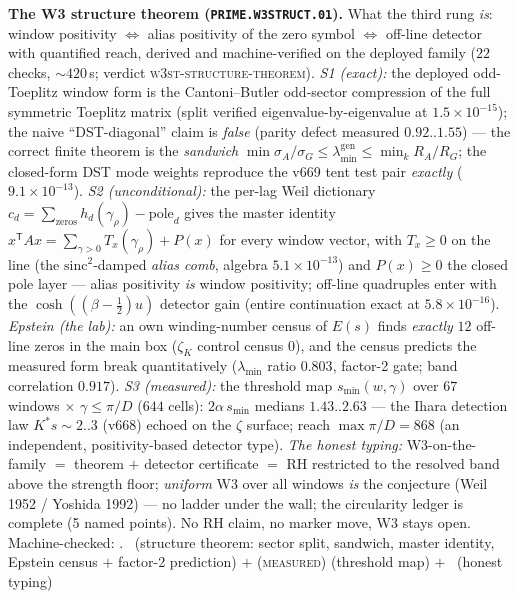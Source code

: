 \documentclass[11pt,a4paper]{article}
\theoremstyle{definition}
\begin{document}
\par\smallskip\noindent\textbf{The W3 structure theorem
(\texttt{PRIME.W3STRUCT.01}).}
What the third rung \emph{is}: window positivity $\Leftrightarrow$
alias positivity of the zero symbol $\Leftrightarrow$ off-line
detector with quantified reach, derived and machine-verified on the
deployed family ($22$ checks, ${\sim}420$\,s; verdict
\textsc{w3st-structure-theorem}).  \emph{S1 (exact):} the deployed
odd-Toeplitz window form is the Cantoni--Butler odd-sector
compression of the full symmetric Toeplitz matrix (split verified
eigenvalue-by-eigenvalue at $1.5\times10^{-15}$); the naive
``DST-diagonal'' claim is \emph{false} (parity defect measured
$0.92..1.55$) --- the correct finite theorem is the \emph{sandwich}
$\min\sigma_A/\sigma_G\le\lambda_{\min}^{\mathrm{gen}}\le
\min_k R_A/R_G$; the closed-form DST mode weights reproduce the
v669 tent test pair \emph{exactly} ($9.1\times10^{-13}$).
\emph{S2 (unconditional):} the per-lag Weil dictionary
$c_d=\sum_{\text{zeros}}h_d(\gamma_\rho)-\mathrm{pole}_d$ gives the
master identity $x^{\mathsf T}Ax=\sum_{\gamma>0}T_x(\gamma_\rho)
+P(x)$ for every window vector, with $T_x\ge0$ on the line (the
$\mathrm{sinc}^2$-damped \emph{alias comb}, algebra
$5.1\times10^{-13}$) and $P(x)\ge0$ the closed pole layer --- alias
positivity \emph{is} window positivity; off-line quadruples enter
with the $\cosh((\beta-\tfrac12)u)$ detector gain (entire
continuation exact at $5.8\times10^{-16}$).  \emph{Epstein (the
lab):} an own winding-number census of $E(s)$ finds \emph{exactly}
$12$ off-line zeros in the main box ($\zeta_K$ control census $0$),
and the census predicts the measured form break quantitatively
($\lambda_{\min}$ ratio $0.803$, factor-2 gate; band correlation
$0.917$).  \emph{S3 (measured):} the threshold map
$s_{\min}(w,\gamma)$ over $67$ windows $\times$ $\gamma\le\pi/D$
($644$ cells): $2\alpha\,s_{\min}$ medians $1.43..2.63$ --- the
Ihara detection law $K^*s\sim2..3$ (v668) echoed on the $\zeta$
surface; reach $\max\pi/D=868$ (an independent, positivity-based
detector type).  \emph{The honest typing:} W3-on-the-family $=$
theorem $+$ detector certificate $=$ RH restricted to the resolved
band above the strength floor; \emph{uniform} W3 over all windows
\emph{is} the conjecture (Weil 1952 / Yoshida 1992) --- no ladder
under the wall; the circularity ledger is complete (5 named
points).  No RH claim, no marker move, W3 stays open.
Machine-checked: .
\mE\ (structure theorem: sector split, sandwich, master identity,
Epstein census $+$ factor-2 prediction) $+$ (\textsc{measured})
(threshold map) $+$ \mC\ (honest typing)
\par\smallskip
\end{document}
